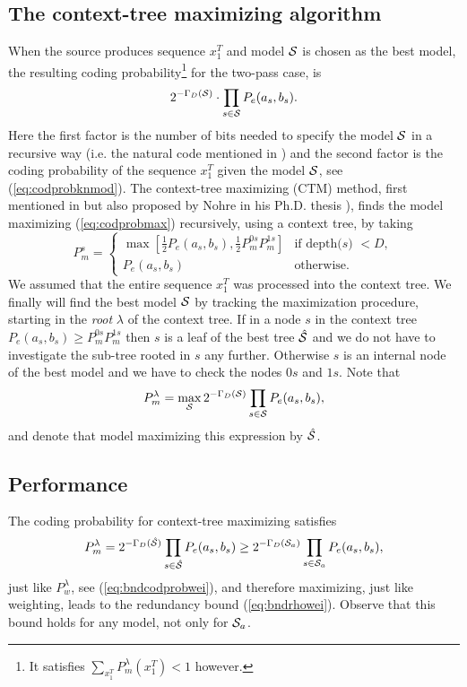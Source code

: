 \documentclass[10pt,conference]{IEEEtran}
\newcommand{\xT}{x^{T}_{1}}
\newcommand{\half}{\frac{1}{2}}
\newcommand{\cS}{{\cal{S}}}
\newcommand{\hcS}{{\hat{\cal{S}}}}
\newcommand{\GD}{{\Gamma_{D}}}
\begin{document}
\subsection{The context-tree maximizing algorithm}
When the source produces sequence $\xT$ and model $\cS$ is chosen as the best model, the resulting coding probability\footnote{It satisfies $\sum_{\xT} P^{\lambda}_m(\xT) < 1$ however.} for the two-pass case, is
\begin{equation}
2^{-\GD(\cS)} \cdot \prod_{s\in\cS} P_{e}(a_s,b_s).\label{eq:codprobmax}
\end{equation}
Here the first factor is the number of bits needed to specify the model $\cS$ in a recursive way (i.e. the natural code mentioned in \cite{WilShtTja95}) and the second factor is the coding probability of the sequence $\xT$ given the model $\cS$, see (\ref{eq:codprobknmod}).
The context-tree maximizing (CTM) method, first mentioned in \cite{WilShtTja93} but also proposed by Nohre in his Ph.D. thesis \cite{Noh94}), finds the model maximizing (\ref{eq:codprobmax}) recursively, using a context tree, by taking
\begin{equation}\label{def:CTM}
P_{m}^{s} = \left\{\begin{array}{ll}
                \max [ \half P_{e}(a_{s},b_{s}) , \half P_{m}^{0s} P_{m}^{1s} ]
                &\mbox{if depth($s$) $<D$}, \\
               P_{e}(a_{s},b_{s}) &\mbox{otherwise.}
                 \end{array} \right.
\end{equation}
We assumed that the entire sequence $\xT$ was processed into the context tree.
We finally will find the best model ${\cal S}$ by tracking the maximization procedure, starting in the {\em root} $\lambda$ of the context tree.
If in a node $s$ in the context tree $P_{e}(a_{s},b_{s}) \geq P_{m}^{0s} P_{m}^{1s}$ then $s$ is a leaf of the best tree ${\hcS}$ and we do not have to investigate the sub-tree rooted in $s$ any further.
Otherwise $s$ is an internal node of the best model and we have to check the nodes $0s$ and $1s$.
Note that
\begin{equation}
P_{m}^{\lambda} = \max_{\cS} 2^{-\GD(\cS)} \prod_{s\in\cS} P_{e}(a_s,b_s),
\end{equation}
and denote that model maximizing this expression by $\hcS$.


\subsection{Performance}
The coding probability for context-tree maximizing satisfies
\begin{equation}
P_{m}^{\lambda} =
2^{-\GD(\hcS)} \prod_{s\in\hcS} P_{e}(a_s,b_s) \geq 2^{-\GD(\cS_a)}  \prod_{s\in\cS_a} P_{e}(a_s,b_s),
\end{equation}
just like $P_w^{\lambda}$, see (\ref{eq:bndcodprobwei}), and therefore maximizing, just like weighting, leads to the redundancy bound (\ref{eq:bndrhowei}).
Observe that this bound holds for any model, not only for $\cS_a$.
\end{document}

